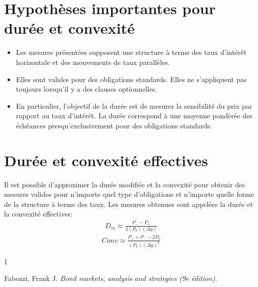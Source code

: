 \documentclass[letterpaper, 12pt]{article}
\newcommand{\1}{\mathds{1}}	%
\theoremstyle{definition}
\begin{document}
\section{Hypothèses importantes pour durée et convexité}
\begin{itemize}
\item Les mesures présentées supposent une structure à terme des taux d’intérêt horizontale et des mouvements de taux parallèles.
\item Elles sont valides pour des obligations standards. Elles ne s’appliquent pas toujours lorsqu’il y a des clauses optionnelles.
\item En particulier, l’objectif de la durée est de mesurer la sensibilité du prix par rapport au taux d’intérêt. La durée correspond à une moyenne pondérée des échéances presqu’exclusivement pour des obligations standards.
\end{itemize}
\section{Durée et convexité effectives}
Il est possible d’approximer la durée modifiée et la convexité pour obtenir des mesures valides pour n’importe quel type d’obligations et n’importe quelle forme de la structure à terme des taux. Les mesures obtenues sont appelées la durée et la convexité effectives:
\begin{align*}
D_m \approx \frac{P_{-}-P_{+}}{2(P_0)(\Delta y)}
\end{align*}
\begin{align*}
Conv\approx \frac{P_{+}+P_{-}-2P_0}{(P_0)(\Delta y)^2}
\end{align*}




\begin{thebibliography}{1}

   Fabozzi, Frank J.
   \textit{Bond markets, analysis and strategies (9e édition)}.
 


\end{thebibliography}

\end{document}

